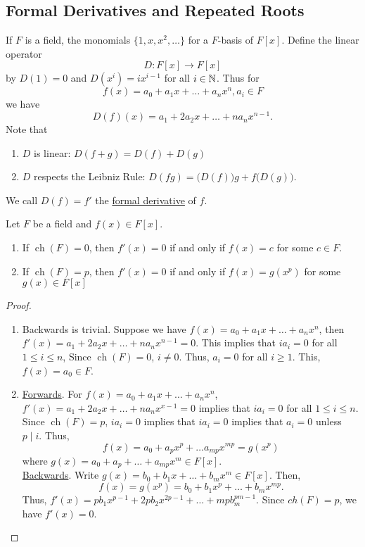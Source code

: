 \documentclass[11pt]{article}
\DeclareMathOperator{\ch}{ch}
\begin{document}
\subsection{Formal Derivatives and Repeated Roots}
\begin{definition}
If $F$ is a field, the monomials $\{1, x, x^2, \dots\}$ for a $F$-basis of
$F[x]$. Define the linear operator
\begin{equation*}
D:F[x] \to F[x]
\end{equation*}
by $D(1) = 0$ and $D(x^i) = ix^{i-1}$ for all $i \in \mathbb{N}$. Thus for
\begin{equation*}
f(x) = a_0 + a_1x + \dots + a_nx^n, a_i \in F
\end{equation*}
we have
\begin{equation*}
D(f)(x) = a_1 + 2a_2x + \dots + na_nx^{n-1}.
\end{equation*}
Note that
\begin{enumerate}
\item $D$ is linear: $D(f+g) = D(f) + D(g)$
\item $D$ respects the Leibniz Rule: $D(fg) = \big(D(f)\big)g +
f\big(D(g)\big)$.
\end{enumerate}
We call $D(f) = f'$ the \underline{formal derivative} of $f$.
\end{definition}
\begin{theorem}
Let $F$ be a field and $f(x) \in F[x]$.
\begin{enumerate}
\item If $\ch(F) = 0$, then $f'(x) = 0$ if and only if $f(x) = c$ for some $c
\in F$.
\item If $\ch(F) = p$, then $f'(x) = 0$ if and only if $f(x) = g(x^p)$ for some
$g(x) \in F[x]$
\end{enumerate}
\label{theorem18}
\end{theorem}
\begin{proof}
\begin{enumerate}
\item Backwards is trivial. Suppose we have $f(x) = a_0 + a_1x + \dots +
a_nx^n$, then $f'(x) = a_1 + 2a_2x + \dots + na_nx^{n-1} = 0$. This implies that
$ia_i = 0$ for all $1 \leq i \leq n$, Since $\ch(F) = 0$, $i \neq 0$. Thus,
$a_i = 0$ for all $i \geq 1$. This, $f(x) = a_0 \in F$.
\item 
\underline{Forwards}. For $f(x) = a_0 + a_1x + \dots + a_nx^n$, $f'(x) = a_1 +
2a_2x + \dots + na_nx^{x-1} = 0$ implies that $ia_i = 0$ for all $1 \leq i \leq
n$. Since $\ch(F) = p$, $ia_i = 0$ implies that $ia_i = 0$ implies that
$a_i = 0$ unless $p \mid i$. Thus,
\begin{equation*}
f(x) = a_0 + a_px^p + \dots a_{mp}x^{mp} = g(x^p)
\end{equation*}
where $g(x) = a_0 + a_p + \dots +a_{mp}x^m \in F[x]$.\\
\underline{Backwards}. Write $g(x) = b_0 + b_1x + \dots + b_mx^m \in
F[x]$. Then,
\begin{equation*}
f(x) = g(x^p) = b_0 + b_1x^p + \dots + b_mx^{mp}.
\end{equation*}
Thus, $f'(x) = pb_1x^{p-1} + 2pb_2x^{2p-1} + \dots + mpb_m^{pm-1}$. Since
$ch(F) = p$, we have $f'(x) = 0$.
\end{enumerate}
\end{proof}
\end{document}
